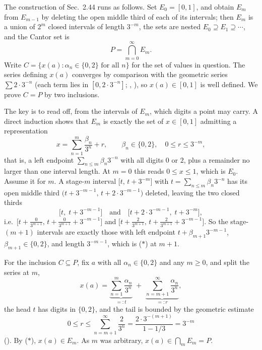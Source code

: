 \documentclass[main.tex]{subfiles}
\begin{document}
\begin{SolutionBlue}
The construction of Sec.\ 2.44 runs as follows. Set $E_{0}=[0,1]$, and obtain $E_{m}$ from $E_{m-1}$ by deleting
the open middle third of each of its intervals; then $E_{m}$ is a union of $2^{m}$ closed intervals of
length $3^{-m}$, the sets are nested $E_{0}\supseteq E_{1}\supseteq\cdots$, and the Cantor set is
\[
P=\bigcap_{m=0}^{\infty}E_{m}.
\]
Write $C=\{x(a):\alpha_{n}\in\{0,2\}\text{ for all }n\}$ for the set of values in question. The series
defining $x(a)$ converges by comparison with the geometric series $\sum 2\cdot 3^{-n}$ (each term lies
in $[0,2\cdot 3^{-n}]$; , ), so $x(a)\in[0,1]$ is well defined. We prove
$C=P$ by two inclusions.

The key is to read off, from the intervals of $E_{m}$, which digits a point may carry. A direct
induction shows that $E_{m}$ is exactly the set of $x\in[0,1]$ admitting a representation
\[
x=\sum_{n=1}^{m}\frac{\beta_{n}}{3^{n}}+r,\qquad \beta_{n}\in\{0,2\},\quad 0\le r\le 3^{-m},
\tag{$\ast$}
\]
that is, a left endpoint $\sum_{n\le m}\beta_{n}3^{-n}$ with all digits $0$ or $2$, plus a remainder no
larger than one interval length. At $m=0$ this reads $0\le x\le 1$, which is $E_{0}$. Assume it for
$m$. A stage-$m$ interval $\bigl[t,\,t+3^{-m}\bigr]$ with $t=\sum_{n\le m}\beta_{n}3^{-n}$ has its open
middle third $\bigl(t+3^{-m-1},\,t+2\cdot 3^{-m-1}\bigr)$ deleted, leaving the two closed thirds
\[
\bigl[t,\;t+3^{-m-1}\bigr]\quad\text{and}\quad\bigl[t+2\cdot 3^{-m-1},\;t+3^{-m}\bigr],
\]
i.e.\ $\bigl[t+\tfrac{0}{3^{m+1}},\,t+\tfrac{0}{3^{m+1}}+3^{-m-1}\bigr]$ and
$\bigl[t+\tfrac{2}{3^{m+1}},\,t+\tfrac{2}{3^{m+1}}+3^{-m-1}\bigr]$. So the stage-$(m+1)$ intervals are
exactly those with left endpoint $t+\beta_{m+1}3^{-m-1}$, $\beta_{m+1}\in\{0,2\}$, and length
$3^{-m-1}$, which is ($\ast$) at $m+1$.

For the inclusion $C\subseteq P$, fix $a$ with all $\alpha_{n}\in\{0,2\}$ and any $m\ge 0$, and split the
series at $m$,
\[
x(a)=\underbrace{\sum_{n=1}^{m}\frac{\alpha_{n}}{3^{n}}}_{=:t}\;+\;\underbrace{\sum_{n=m+1}^{\infty}\frac{\alpha_{n}}{3^{n}}}_{=:r},
\]
the head $t$ has digits in $\{0,2\}$, and the tail is bounded by the geometric estimate
\[
0\le r\le\sum_{n=m+1}^{\infty}\frac{2}{3^{n}}=\frac{2\cdot 3^{-(m+1)}}{1-1/3}=3^{-m}
\]
(). By ($\ast$), $x(a)\in E_{m}$. As $m$ was arbitrary, $x(a)\in\bigcap_{m}E_{m}=P$.


\end{SolutionBlue}
\end{document}
